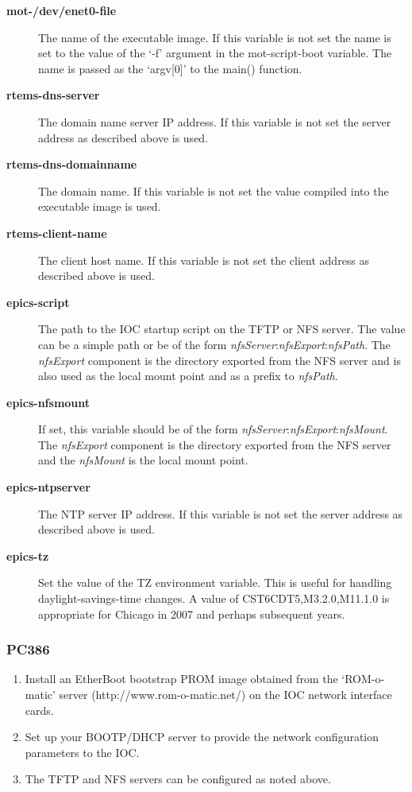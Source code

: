 \documentclass{report}
\begin{document}
\begin{description}
\item[{\bf mot-/dev/enet0-file}]
The name of the executable image.  If this variable is not set the name is 
set to the value of the `-f' argument in the mot-script-boot variable.
The name is passed as the `argv[0]' to the main() function.

\item[{\bf rtems-dns-server}]
The domain name server IP address.  If this variable is not set the server address as described above is used.

\item[{\bf rtems-dns-domainname}]
The domain name.  If this variable is not set the value compiled into the executable image is used.

\item[{\bf rtems-client-name}]
The client host name.  If this variable is not set the client address as described above is used.

\item[{\bf epics-script}]
The path to the IOC startup script on the TFTP or NFS server. 
The value can be a simple path or be of the form
\textit{nfsServer}:\textit{nfsExport}:\textit{nfsPath}.
The \textit{nfsExport} component is the directory exported from the NFS server and is also used as the local mount point and as a prefix to \textit{nfsPath}.


\item[{\bf epics-nfsmount}]
If set, this variable should be of the form
\textit{nfsServer}:\textit{nfsExport}:\textit{nfsMount}.
The \textit{nfsExport} component is the directory exported from the NFS server
and the \textit{nfsMount} is the local mount point.

\item[{\bf epics-ntpserver}]
The NTP server IP address.  If this variable is not set the server address as described above is used.

\item[{\bf epics-tz}]
Set the value of the TZ environment variable.
This is useful for handling daylight-savings-time changes.  A value of
CST6CDT5,M3.2.0,M11.1.0 is appropriate for Chicago in 2007 and perhaps subsequent years.

\end{description}

\subsubsection{PC386}
\begin{enumerate}
\item Install an EtherBoot bootstrap PROM image obtained from
the `ROM-o-matic' server (http://www.rom-o-matic.net/) on the IOC
network interface cards.
\item Set up your BOOTP/DHCP server to provide the network configuration
parameters to the IOC.
\item The TFTP and NFS servers can be configured as noted above.
\end{enumerate}
\end{document}
